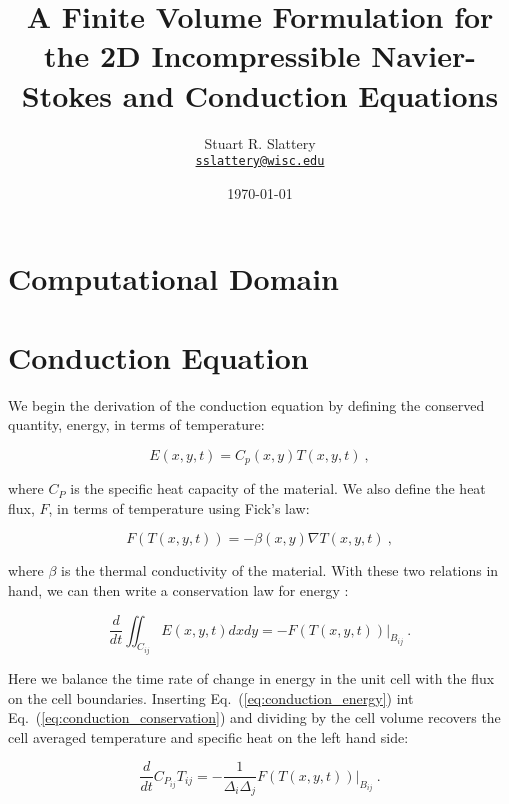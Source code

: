 \documentclass[letterpaper,12pt]{article}
\author{Stuart R. Slattery
\\ \href{mailto:sslattery@wisc.edu}{\texttt{sslattery@wisc.edu}}
}
\date{\today}
\title{A Finite Volume Formulation for the 2D Incompressible
  Navier-Stokes and Conduction Equations}
\begin{document}
\maketitle

\section{Computational Domain}

\section{Conduction Equation}
We begin the derivation of the conduction equation by defining the
conserved quantity, energy, in terms of temperature:

\begin{equation}
  E(x,y,t) = C_p(x,y) T(x,y,t)\:,
  \label{eq:conduction_energy}
\end{equation}

where $C_P$ is the specific heat capacity of the material. We also
define the heat flux, $F$, in terms of temperature using Fick's law:

\begin{equation}
  F(T(x,y,t)) = -\beta(x,y) \nabla T(x,y,t)\:,
  \label{eq:conduction_ficks_law}
\end{equation}

where $\beta$ is the thermal conductivity of the material. With these
two relations in hand, we can then write a conservation law for energy
\cite{leveque_2002}:

\begin{equation}
  \frac{d}{dt} \iint_{C_{ij}} E(x,y,t) dx dy = -F(T(x,y,t)) |_{B_{ij}}\:.
  \label{eq:conduction_conservation}
\end{equation}

Here we balance the time rate of change in energy in the unit cell
with the flux on the cell boundaries. Inserting
Eq.~(\ref{eq:conduction_energy}) int
Eq.~(\ref{eq:conduction_conservation}) and dividing by the cell volume
recovers the cell averaged temperature and specific heat on the left
hand side:

\begin{equation}
  \frac{d}{dt} C_{P_{ij}} T_{ij} = -\frac{1}{\Delta_i
    \Delta_j}F(T(x,y,t)) |_{B_{ij}}\:.
  \label{eq:conduction_cell_averaged}
\end{equation}
\end{document}
